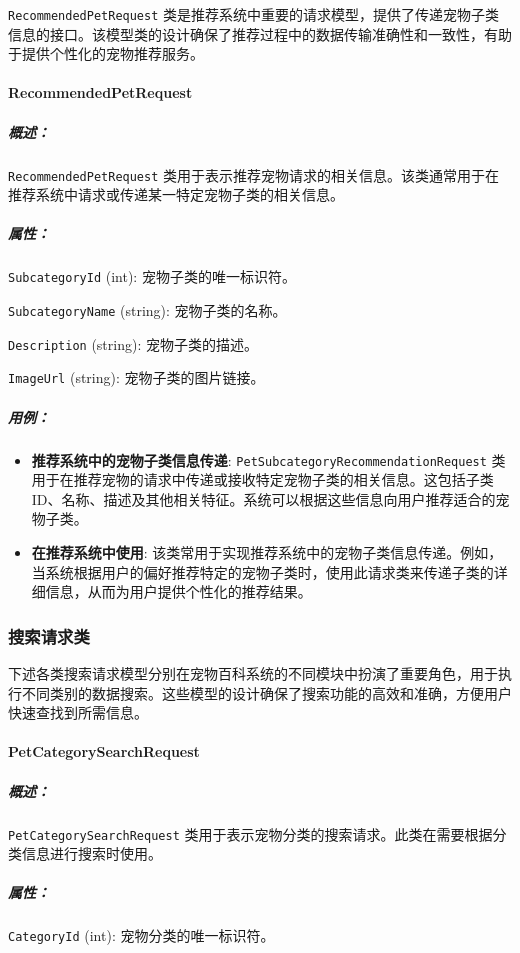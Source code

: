 \texttt{RecommendedPetRequest} 类是推荐系统中重要的请求模型，提供了传递宠物子类信息的接口。该模型类的设计确保了推荐过程中的数据传输准确性和一致性，有助于提供个性化的宠物推荐服务。

\paragraph{RecommendedPetRequest}
\subparagraph{概述：} \texttt{RecommendedPetRequest} 类用于表示推荐宠物请求的相关信息。该类通常用于在推荐系统中请求或传递某一特定宠物子类的相关信息。

\subparagraph{属性：}

\texttt{SubcategoryId} (int): 宠物子类的唯一标识符。

\texttt{SubcategoryName} (string): 宠物子类的名称。

\texttt{Description} (string): 宠物子类的描述。

\texttt{ImageUrl} (string): 宠物子类的图片链接。


\subparagraph{用例：}
\begin{itemize}
	\item \textbf{推荐系统中的宠物子类信息传递}: \texttt{PetSubcategoryRecommendationRequest} 类用于在推荐宠物的请求中传递或接收特定宠物子类的相关信息。这包括子类ID、名称、描述及其他相关特征。系统可以根据这些信息向用户推荐适合的宠物子类。
	\item \textbf{在推荐系统中使用}: 该类常用于实现推荐系统中的宠物子类信息传递。例如，当系统根据用户的偏好推荐特定的宠物子类时，使用此请求类来传递子类的详细信息，从而为用户提供个性化的推荐结果。
\end{itemize}


\subsubsection{搜索请求类}

下述各类搜索请求模型分别在宠物百科系统的不同模块中扮演了重要角色，用于执行不同类别的数据搜索。这些模型的设计确保了搜索功能的高效和准确，方便用户快速查找到所需信息。

\paragraph{PetCategorySearchRequest}
\subparagraph{概述：} \texttt{PetCategorySearchRequest} 类用于表示宠物分类的搜索请求。此类在需要根据分类信息进行搜索时使用。

\subparagraph{属性：}

\texttt{CategoryId} (int): 宠物分类的唯一标识符。


